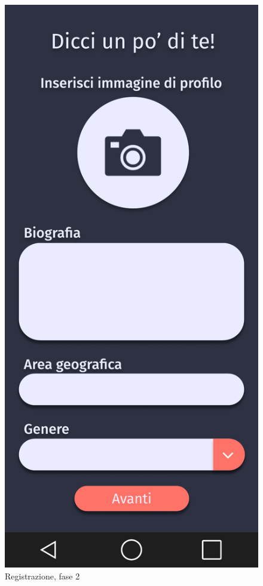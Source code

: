     \begin{figure}[!htb]
        \begin{minipage}{0.32\textwidth}
            \centering
            \includegraphics[width=.7\linewidth]{Immagini/Frames/9.pdf}
            \caption{Registrazione, fase 2}
        \end{minipage}\hfill
        \begin{minipage}{0.32\textwidth}
            \centering

\end{minipage}
\end{figure}

